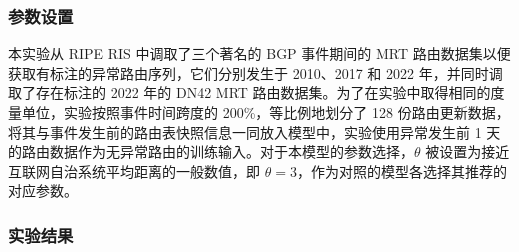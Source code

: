 \subsubsection{参数设置}

本实验从 RIPE RIS 中调取了三个著名的 BGP 事件期间的 MRT 路由数据集以便获取有标注的异常路由序列，它们分别发生于 2010、2017 和 2022 年，并同时调取了存在标注的 2022 年的 DN42 MRT 路由数据集。为了在实验中取得相同的度量单位，实验按照事件时间跨度的 200\%，等比例地划分了 128 份路由更新数据，将其与事件发生前的路由表快照信息一同放入模型中，实验使用异常发生前 1 天的路由数据作为无异常路由的训练输入。对于本模型的参数选择，$\theta$ 被设置为接近互联网自治系统平均距离的一般数值，即 $\theta=3$，作为对照的模型各选择其推荐的对应参数。

\subsubsection{实验结果}


